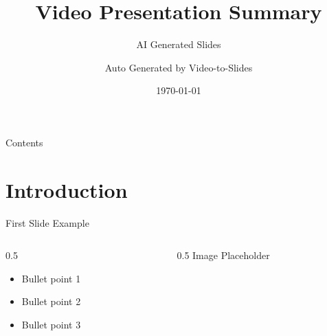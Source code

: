 \documentclass[aspectratio=169, 12pt]{beamer}
\title{Video Presentation Summary}
\subtitle{AI Generated Slides}
\author{Auto Generated by Video-to-Slides}
\date{\today}
\begin{document}
\begin{frame}[plain]
    \titlepage
\end{frame}

\begin{frame}{Contents}
    \tableofcontents
\end{frame}


\section{Introduction}

\begin{frame}{First Slide Example}
    \begin{columns}
        \begin{column}{0.5\textwidth}
            \begin{itemize}
                \item Bullet point 1
                \item Bullet point 2
                \item Bullet point 3
            \end{itemize}
        \end{column}
        
        \begin{column}{0.5\textwidth}
            \centering
            \small Image Placeholder
        \end{column}
    \end{columns}
\end{frame}
\end{document}
